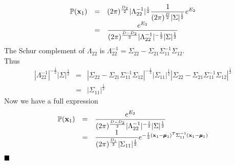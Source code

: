 \documentclass[11pt,a4paper]{article}
\begin{document}
\[\begin{array}{rcl}
\mathbb{P}(\textbf{x}_1)&=&(2\pi)^{\frac{D_2}{2}}|\Lambda_{22}^{-1}|^{\frac{1}{2}}\dfrac{1}{(2\pi)^{\frac{D}{2}}|\Sigma|^{\frac{1}{2}}}e^{E_2}\\
&=&\dfrac{e^{E_2}}{(2\pi)^{\frac{D-D_2}{2}}|\Lambda_{22}^{-1}|^{-\frac{1}{2}}|\Sigma|^{\frac{1}{2}}}
\end{array}\]
The Schur complement of $\Lambda_{22}$ is $\Lambda^{-1}_{22}=\Sigma_{22}-\Sigma_{21}\Sigma_{11}^{-1}\Sigma_{12}$.\\
Thus \[\begin{array}{rcl}
|\Lambda_{22}^{-1}|^{-\frac{1}{2}}|\Sigma|^{\frac{1}{2}}&=&|\Sigma_{22}-\Sigma_{21}\Sigma_{11}^{-1}\Sigma_{12}|^{-\frac{1}{2}}|\Sigma_{11}|^{\frac{1}{2}}|\Sigma_{22}-\Sigma_{21}\Sigma_{11}^{-1}\Sigma_{12}|^{\frac{1}{2}}\\
&=&|\Sigma_{11}|^{\frac{1}{2}}
\end{array}\]
Now we have a full expression
\[\begin{array}{rcl}
\mathbb{P}(\textbf{x}_1)&=&\dfrac{e^{E_2}}{(2\pi)^{\frac{D-D_2}{2}}|\Lambda_{22}^{-1}|^{-\frac{1}{2}}|\Sigma|^{\frac{1}{2}}}\\
&=&\dfrac{1}{(2\pi)^{\frac{D_1}{2}}|\Sigma_{11}|^{\frac{1}{2}}}e^{-\frac{1}{2}(\textbf{x}_1-\pmb{\mu}_1)^T\Sigma_{11}^{-1}(\textbf{x}_1-\pmb{\mu}_1)}
\end{array}\]
$\hfill{\blacksquare}$
\end{document}
